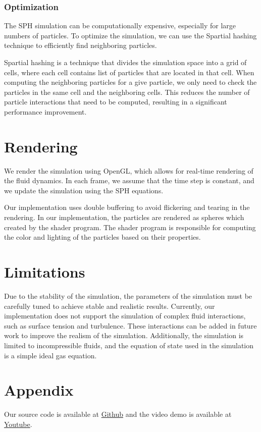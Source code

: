 \documentclass[a4paper]{article}
\begin{document}
\subsubsection{Optimization}

The SPH simulation can be computationally expensive, especially for large numbers of particles.
To optimize the simulation, we can use the Spartial hashing technique to efficiently find neighboring particles.

Spartial hashing is a technique that divides the simulation space into a grid of cells, where each cell contains list of particles that are located in that cell.
When computing the neighboring particles for a give particle, we only need to check the particles in the same cell and the neighboring cells.
This reduces the number of particle interactions that need to be computed, resulting in a significant performance improvement.

\section{Rendering}

We render the simulation using OpenGL, which allows for real-time rendering of the fluid dynamics.
In each frame, we assume that the time step is constant, and we update the simulation using the SPH equations.

\medskip

Our implementation uses double buffering to avoid flickering and tearing in the rendering.
In our implementation, the particles are rendered as spheres which created by the shader program.
The shader program is responsible for computing the color and lighting of the particles based on their properties.

\section{Limitations}

Due to the stability of the simulation, the parameters of the simulation must be carefully tuned to achieve stable and realistic results.
Currently, our implementation does not support the simulation of complex fluid interactions, such as surface tension and turbulence.
These interactions can be added in future work to improve the realism of the simulation.
Additionally, the simulation is limited to incompressible fluids, and the equation of state used in the simulation is a simple ideal gas equation.

\nocite{*}
\printbibliography

\section*{Appendix}

Our source code is available at \href{https://github.com/MasterIceZ/SPH-FluidSimulation}{Github} and the video demo is available at \href{https://youtube.com}{Youtube}.
\end{document}
